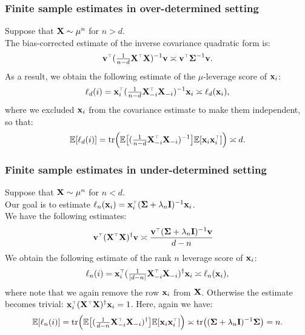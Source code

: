 \documentclass[10pt]{beamer}
\begin{document}
\begin{frame}
  \frametitle{Finite sample estimates in over-determined setting}
  Suppose that $\mathbf X\sim\mu^n$ for $n>d$.
  \\The bias-corrected estimate of the  inverse covariance 
  quadratic form is:
  \begin{align*}
\v^\top(\tfrac{1}{n-d}\X^\top\X)^{-1}\v \asymp \v^\top\Sigmab^{-1}\v.
  \end{align*}
  As a result, we obtain the following estimate of the $\mu$-leverage
  score of $\mathbf x_i$:
  \begin{align*}
    \ell_d(i) = \x_i^\top(\tfrac1{n-d}\X_{-i}^\top\X_{-i})^{-1}\x_i \asymp \ell_d(\x_i),
  \end{align*}
  where we excluded $\mathbf x_i$ from the covariance estimate to make them
  independent, so that:
  \begin{align*}
    \E[\ell_d(i)] =
    \tr\Big(\E\big[(\tfrac1{n-d}\X_{-i}^\top\X_{-i})^{-1}\big]\E[\x_i\x_i^\top]\Big)
    \asymp d.
  \end{align*}
\end{frame}

\begin{frame}
  \frametitle{ Finite sample estimates in under-determined setting }
  Suppose that $\mathbf X\sim\mu^n$ for $n<d$.\\
  Our goal is to estimate $\ell_n(\x_i)=\x_i^\top(\Sigmab+\lambda_n\I)^{-1}\x_i$.\\
  We have the following estimates:
  \begin{align*}
\v^\top(\X^\top\X)^\dagger\v
    &\asymp \frac{\v^\top(\Sigmab +\lambda_n\I)^{-1}\v}{d-n}
  \end{align*}
  We obtain the following estimate of the rank $n$ leverage score of $\mathbf x_i$:
  \begin{align*}
    \ell_n(i) = 
    \x_i^\top(\tfrac1{|d-n|}\X_{-i}^\top\X_{-i})^\dagger\x_i
    \asymp\ell_n(\x_i),
  \end{align*}
  where note that we again remove the row $\mathbf x_i$ from $\mathbf X$. Otherwise
  the estimate becomes trivial: 
  $\x_i^\top(\X^\top\X)^\dagger\x_i = 1$.
  Here, again we have:
    \begin{align*}
    \E[\ell_n(i)] =
    \tr\Big(\E\big[(\tfrac1{d-n}\X_{-i}^\top\X_{-i})^\dagger\big]\E[\x_i\x_i^\top]\Big)
    \asymp \tr\big((\Sigmab+\lambda_n\I)^{-1}\Sigmab\big) = n.
  \end{align*}

\end{frame}
\end{document}

